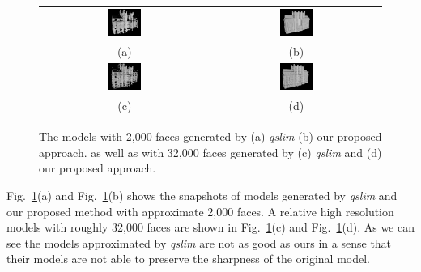 \documentclass{acmsiggraph}                     %
\newcommand{\Figa}[1]{Fig.~\ref{fig:#1}(a)}
\newcommand{\Figb}[1]{Fig.~\ref{fig:#1}(b)}
\newcommand{\Figc}[1]{Fig.~\ref{fig:#1}(c)}
\newcommand{\Figd}[1]{Fig.~\ref{fig:#1}(d)}
\begin{document}
\begin{figure}[htbp]
\begin{center}
\begin{tabular}{cc}
\includegraphics[width=0.2\textwidth]{comp_32_2_qslim.png} &
\includegraphics[width=0.2\textwidth]{comp_32_2.png} \\
(a) & (b) \\
\includegraphics[width=0.2\textwidth]{comp_4_2_qslim.png} &
\includegraphics[width=0.2\textwidth]{comp_4_2.png} \\
(c) & (d)
\end{tabular}
\end{center}
\caption{The models with 2,000 faces generated by (a) {\it qslim} (b) our proposed approach. as well as with 32,000 faces
generated by (c) {\it qslim} and (d) our proposed approach.}
\label{fig:TH_comp}
\end{figure}

\Figa{TH_comp} and \Figb{TH_comp} shows the snapshots of models generated by {\it qslim} and our proposed
method with approximate 2,000 faces. A relative high resolution models with roughly 32,000
faces are shown in \Figc{TH_comp} and \Figd{TH_comp}. As we can see the models approximated by {\it qslim}
are not as good as ours in a sense that their models are not able to preserve the sharpness of the
original model.
\end{document}
